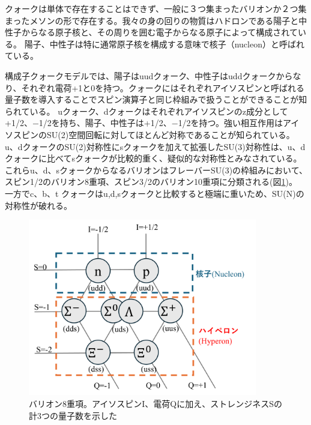 \documentclass[a4paper,11pt,uplatex]{jsbook}
\begin{document}
クォークは単体で存在することはできず、一般に３つ集まったバリオンか２つ集まったメソンの形で存在する。我々の身の回りの物質はハドロンである陽子と中性子からなる原子核と、その周りを囲む電子からなる原子によって構成されている。
陽子、中性子は特に通常原子核を構成する意味で核子（nucleon）と呼ばれている。

構成子クォークモデルでは、陽子はuudクォーク、中性子はuddクォークからなり、それぞれ電荷+1と0を持つ。クォークにはそれぞれアイソスピンと呼ばれる量子数を導入することでスピン演算子と同じ枠組みで扱うことができることが知られている。
uクォーク、dクォークはそれぞれアイソスピンのz成分として+1/2、$-$1/2を持ち、陽子、中性子は+1/2、$-$1/2を持つ。強い相互作用はアイソスピンのSU(2)空間回転に対してほとんど対称であることが知られている。
u、dクォークのSU(2)対称性にsクォークを加えて拡張したSU(3)対称性は、u、dクォークに比べてsクォークが比較的重く、疑似的な対称性とみなされている。
これらu、d、sクォークからなるバリオンはフレーバーSU(3)の枠組みにおいて、スピン1/2のバリオン8重項、スピン3/2のバリオン10重項に分類される(図\ref{fig:baryon})。
一方でc、b、t クォークはu,d,sクォークと比較すると極端に重いため、SU(N)の対称性が破れる。
\begin{figure}[tb]
  \centering
  \includegraphics[width=10cm]{image/1_baryon.png}
  \caption[バリオン8重項]{バリオン8重項。アイソスピンI、電荷Qに加え、ストレンジネスSの計3つの量子数を示した}
  \label{fig:baryon}
\end{figure}
\end{document}
